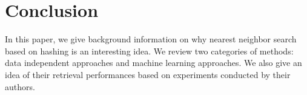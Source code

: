 \section{Conclusion}
In this paper, we give background information on why nearest neighbor search based on hashing is an interesting idea. We review two categories of methods: data independent approaches and machine learning approaches. We also give an idea of their retrieval performances based on experiments conducted by their authors.